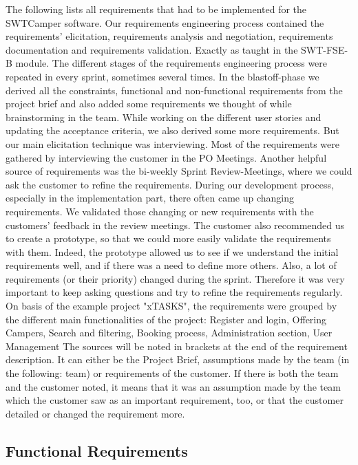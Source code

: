 The following lists all requirements that had to be implemented for the SWTCamper software.
Our requirements engineering process contained the requirements' elicitation, requirements analysis and negotiation, requirements documentation and requirements validation.
Exactly as taught in the SWT-FSE-B module.
The different stages of the requirements engineering process were repeated in every sprint, sometimes several times.
In the blastoff-phase we derived all the constraints, functional and non-functional requirements from the project brief and also added some requirements we thought of while brainstorming in the team.
While working on the different user stories and updating the acceptance criteria, we also derived some more requirements.
But our main elicitation technique was interviewing.
Most of the requirements were gathered by interviewing the customer in the PO Meetings.
Another helpful source of requirements was the bi-weekly Sprint Review-Meetings, where we could ask the customer to refine the requirements.
During our development process, especially in the implementation part, there often came up changing requirements.
We validated those changing or new requirements with the customers' feedback in the review meetings.
The customer also recommended us to create a prototype, so that we could more easily validate the requirements with them.
Indeed, the prototype allowed us to see if we understand the initial requirements well, and if there was a need to define more others.
Also, a lot of requirements (or their priority) changed during the sprint.
Therefore it was very important to keep asking questions and try to refine the requirements regularly.
On basis of the example project "xTASKS", the requirements were grouped by the different main functionalities of the project:
Register and login, Offering Campers, Search and filtering, Booking process, Administration section, User Management %
The sources will be noted in brackets at the end of the requirement description.
It can either be the Project Brief, assumptions made by the team (in the following: team) or requirements of the customer.
If there is both the team and the customer noted, it means that it was an assumption made by the team which the customer saw as an important requirement, too, or that the customer detailed or changed the requirement more.

\subsection{Functional Requirements}


